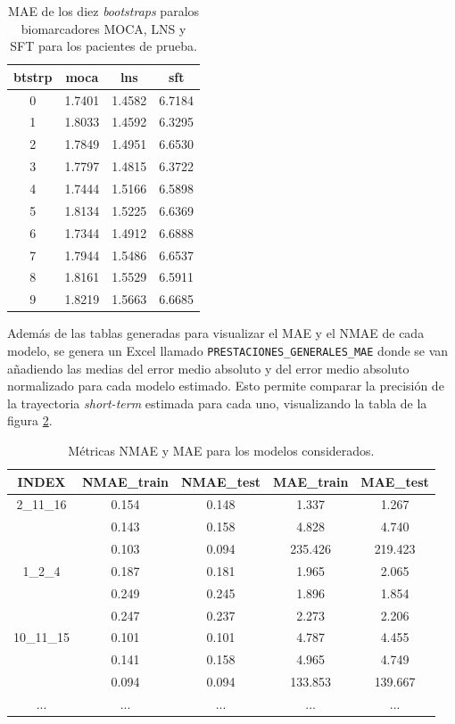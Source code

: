 \begin{table}[h!]
	\centering
	\begin{tabular}{|c|c|c|c|}
		\hline
		btstrp & \textbf{moca} & \textbf{lns} & \textbf{sft} \\ \hline
		0 & 1.7401 & 1.4582 & 6.7184 \\ \hline
		1 & 1.8033 & 1.4592 & 6.3295 \\ \hline
		2 & 1.7849 & 1.4951 & 6.6530 \\ \hline
		3 & 1.7797 & 1.4815 & 6.3722 \\ \hline
		4 & 1.7444 & 1.5166 & 6.5898 \\ \hline
		5 & 1.8134 & 1.5225 & 6.6369 \\ \hline
		6 & 1.7344 & 1.4912 & 6.6888 \\ \hline
		7 & 1.7944 & 1.5486 & 6.6537 \\ \hline
		8 & 1.8161 & 1.5529 & 6.5911 \\ \hline
		9 & 1.8219 & 1.5663 & 6.6685 \\ \hline
	\end{tabular}
	\caption{MAE de los diez \textit{bootstraps} paralos biomarcadores MOCA, LNS y SFT para los pacientes de prueba.}
	\label{tabla_MAE_test}
\end{table}

Además de las tablas generadas para visualizar el MAE y el NMAE de cada modelo, se genera un Excel llamado \texttt{PRESTACIONES\_GENERALES\_MAE} donde se van añadiendo las medias del error medio absoluto y del error medio absoluto normalizado para cada modelo estimado. Esto permite comparar la precisión de la trayectoria \textit{short-term} estimada para cada uno, visualizando la tabla de la figura \ref{tab:nmae_mae_resultados}.

\begin{table}[t]
	\centering
	\begin{tabular}{|c|c|c|c|c|}
		\hline
		\textbf{\scriptsize{INDEX}} & \textbf{\scriptsize{NMAE\_train}} & \textbf{\scriptsize{NMAE\_test}} & \textbf{\scriptsize{MAE\_train}} & \textbf{\scriptsize{MAE\_test}} \\ \hline
		2\_11\_16 & 0.154 & 0.148 & 1.337 & 1.267 \\ 
		& 0.143 & 0.158 & 4.828 & 4.740 \\ 
		& 0.103 & 0.094 & 235.426 & 219.423 \\ \hline
		1\_2\_4   & 0.187 & 0.181 & 1.965 & 2.065 \\ 
		& 0.249 & 0.245 & 1.896 & 1.854 \\ 
		& 0.247 & 0.237 & 2.273 & 2.206 \\ \hline
		10\_11\_15& 0.101 & 0.101 & 4.787 & 4.455 \\ 
		& 0.141 & 0.158 & 4.965 & 4.749 \\ 
		& 0.094 & 0.094 & 133.853 & 139.667 \\ \hline
		...  & ... & ... & ... & ...\\ \hline
	\end{tabular}
	\caption{Métricas NMAE y MAE para los modelos considerados.}
	\label{tab:nmae_mae_resultados}
\end{table}




